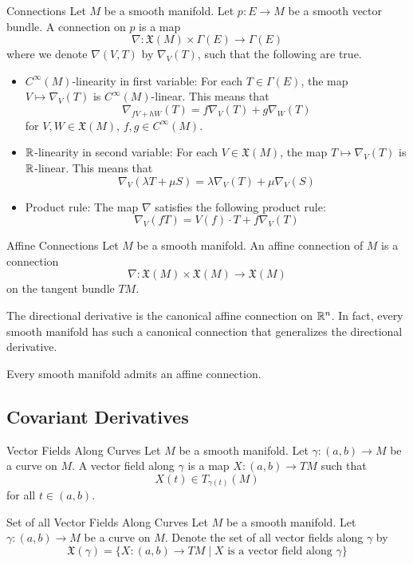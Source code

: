 \documentclass[a4paper]{article}
\begin{document}
\begin{defn}{Connections}{} Let $M$ be a smooth manifold. Let $p:E\to M$ be a smooth vector bundle. A connection on $p$ is a map $$\nabla:\mathfrak{X}(M)\times\Gamma(E)\to\Gamma(E)$$ where we denote $\nabla(V,T)$ by $\nabla_V(T)$, such that the following are true. 
\begin{itemize}
\item $C^\infty(M)$-linearity in first variable: For each $T\in\Gamma(E)$, the map $V\mapsto\nabla_V(T)$ is $C^\infty(M)$-linear. This means that $$\nabla_{fV+hW}(T)=f\nabla_V(T)+g\nabla_W(T)$$ for $V,W\in\mathfrak{X}(M)$, $f,g\in C^\infty(M)$. 
\item $\mathbb{R}$-linearity in second variable: For each $V\in\mathfrak{X}(M)$, the map $T\mapsto\nabla_V(T)$ is $\mathbb{R}$-linear. This means that $$\nabla_V(\lambda T+\mu S)=\lambda\nabla_V(T)+\mu\nabla_V(S)$$
\item Product rule: The map $\nabla$ satisfies the following product rule: $$\nabla_V(fT)=V(f)\cdot T+f\nabla_V(T)$$
\end{itemize}
\end{defn}

\begin{defn}{Affine Connections}{} Let $M$ be a smooth manifold. An affine connection of $M$ is a connection $$\nabla:\mathfrak{X}(M)\times\mathfrak{X}(M)\to\mathfrak{X}(M)$$ on the tangent bundle $TM$. 
\end{defn}

The directional derivative is the canonical affine connection on $\mathbb{R}^n$. In fact, every smooth manifold has such a canonical connection that generalizes the directional derivative. 

\begin{thm}{}{} Every smooth manifold admits an affine connection. 
\end{thm}

\subsection{Covariant Derivatives}
\begin{defn}{Vector Fields Along Curves}{} Let $M$ be a smooth manifold. Let $\gamma:(a,b)\to M$ be a curve on $M$. A vector field along $\gamma$ is a map $X:(a,b)\to TM$ such that $$X(t)\in T_{\gamma(t)}(M)$$ for all $t\in(a,b)$. 
\end{defn}

\begin{defn}{Set of all Vector Fields Along Curves}{} Let $M$ be a smooth manifold. Let $\gamma:(a,b)\to M$ be a curve on $M$. Denote the set of all vector fields along $\gamma$ by $$\mathfrak{X}(\gamma)=\{X:(a,b)\to TM\;|\;X\text{ is a vector field along }\gamma\}$$
\end{defn}
\end{document}
